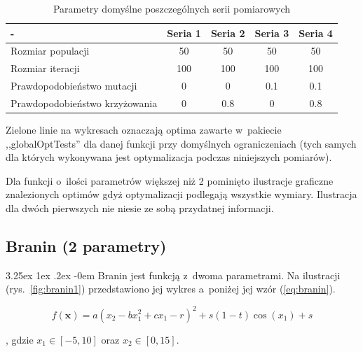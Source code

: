 \documentclass[11pt, a4paper]{article}
\makeatletter
\newcommand{\fbi}{\leavevmode{\parindent=1em\indent}}
\renewcommand\paragraph{\@startsection{paragraph}{5}{\z@}
  {3.25ex \@plus1ex \@minus.2ex}
  {-0em}
  {\normalfont\normalsize\bfseries}}
\makeatother
\begin{document}
\begin{table}[H]
	\centering
	\caption{Parametry domyślne poszczególnych serii pomiarowych}
	\label{tab:parametry}
	\begin{tabularx}{\textwidth}{|X|c|c|c|c|}
		\hline
		- & Seria 1 & Seria 2 & Seria 3 & Seria 4\\ 
		\hline
		Rozmiar populacji & 50 & 50 & 50 & 50 \\ 
		\hline 
		Rozmiar iteracji & 100 & 100 & 100 & 100 \\ 
		\hline 
		Prawdopodobieństwo mutacji & 0 & 0 & 0.1 & 0.1 \\ 
		\hline 
		Prawdopodobieństwo krzyżowania & 0 & 0.8 & 0 & 0.8 \\ 
		\hline 
	\end{tabularx} 
\end{table}

\fbi
Zielone linie na wykresach oznaczają optima zawarte w~pakiecie ,,globalOptTests'' dla danej funkcji przy domyślnych ograniczeniach (tych samych dla których wykonywana jest optymalizacja podczas niniejszych pomiarów).

\fbi
Dla funkcji o~ilości parametrów większej niż 2 pominięto ilustracje graficzne znalezionych optimów gdyż optymalizacji podlegają wszystkie wymiary. Ilustracja dla dwóch pierwszych nie niesie ze sobą przydatnej informacji.

\newpage
\subsection{Branin (2 parametry)}
\paragraph{}
Branin jest funkcją z~dwoma parametrami. Na ilustracji (rys.~\ref{fig:branin1}) przedstawiono jej wykres a~poniżej jej wzór (\ref{eq:branin}).

\begin{equation}\label{eq:branin}
	f(\boldsymbol{x}) = a(x_2 - bx_1^2 + cx_1 - r)^2 + s(1 - t)\cos(x_1) + s
\end{equation}

, gdzie $ x_1 \in [-5, 10] $ oraz $ x_2 \in [0, 15] $.
\end{document}
